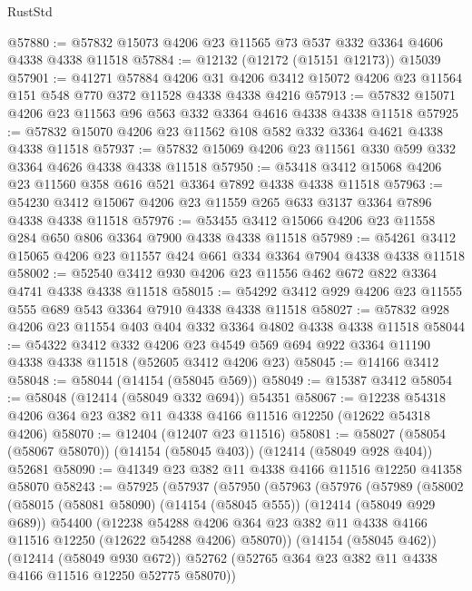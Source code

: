 \begin{lexlean}{RustStd}
\begin{coremodule}
@57880 := @57832 @15073 @4206 @23 @11565 @73 @537 @332 @3364 @4606 @4338 @4338 @11518
@57884 := @12132 (@12172 (@15151 @12173)) @15039
@57901 := @41271
    @57884
    @4206
    @31
    @4206
    @3412
    @15072
    @4206
    @23
    @11564
    @151
    @548
    @770
    @372
    @11528
    @4338
    @4338
    @4216
@57913 := @57832 @15071 @4206 @23 @11563 @96 @563 @332 @3364 @4616 @4338 @4338 @11518
@57925 := @57832 @15070 @4206 @23 @11562 @108 @582 @332 @3364 @4621 @4338 @4338 @11518
@57937 := @57832 @15069 @4206 @23 @11561 @330 @599 @332 @3364 @4626 @4338 @4338 @11518
@57950 := @53418 @3412 @15068 @4206 @23 @11560 @358 @616 @521 @3364 @7892 @4338 @4338 @11518
@57963 := @54230 @3412 @15067 @4206 @23 @11559 @265 @633 @3137 @3364 @7896 @4338 @4338 @11518
@57976 := @53455 @3412 @15066 @4206 @23 @11558 @284 @650 @806 @3364 @7900 @4338 @4338 @11518
@57989 := @54261 @3412 @15065 @4206 @23 @11557 @424 @661 @334 @3364 @7904 @4338 @4338 @11518
@58002 := @52540 @3412 @930 @4206 @23 @11556 @462 @672 @822 @3364 @4741 @4338 @4338 @11518
@58015 := @54292 @3412 @929 @4206 @23 @11555 @555 @689 @543 @3364 @7910 @4338 @4338 @11518
@58027 := @57832 @928 @4206 @23 @11554 @403 @404 @332 @3364 @4802 @4338 @4338 @11518
@58044 := @54322
    @3412
    @332
    @4206
    @23
    @4549
    @569
    @694
    @922
    @3364
    @11190
    @4338
    @4338
    @11518
    (@52605 @3412 @4206 @23)
@58045 := @14166 @3412
@58048 := @58044 (@14154 (@58045 @569))
@58049 := @15387 @3412
@58054 := @58048 (@12414 (@58049 @332 @694)) @54351
@58067 := @12238 @54318 @4206 @364 @23 @382 @11 @4338 @4166 @11516 @12250 (@12622 @54318 @4206)
@58070 := @12404 (@12407 @23 @11516)
@58081 := @58027 (@58054 (@58067 @58070)) (@14154 (@58045 @403)) (@12414 (@58049 @928 @404)) @52681
@58090 := @41349 @23 @382 @11 @4338 @4166 @11516 @12250 @41358 @58070
@58243 := @57925
    (@57937
      (@57950
        (@57963
          (@57976
            (@57989
              (@58002
                (@58015
                  (@58081 @58090)
                  (@14154 (@58045 @555))
                  (@12414 (@58049 @929 @689))
                  @54400
                  (@12238
                    @54288
                    @4206
                    @364
                    @23
                    @382
                    @11
                    @4338
                    @4166
                    @11516
                    @12250
                    (@12622 @54288 @4206)
                    @58070))
                (@14154 (@58045 @462))
                (@12414 (@58049 @930 @672))
                @52762
                (@52765 @364 @23 @382 @11 @4338 @4166 @11516 @12250 @52775 @58070))

\end{coremodule}
\end{lexlean}

